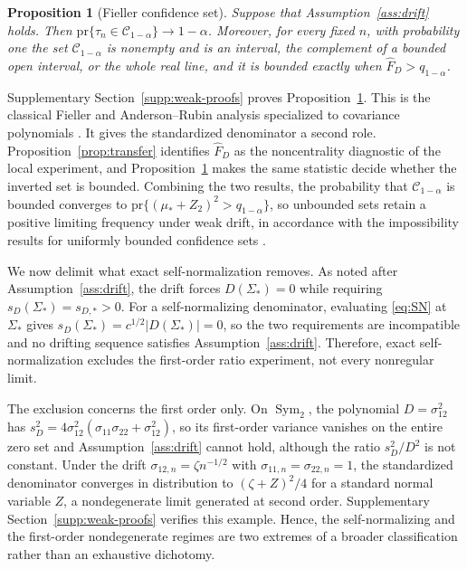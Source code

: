 \documentclass[12pt,a4paper]{article}
\theoremstyle{plain}
\newtheorem{proposition}{Proposition}
\theoremstyle{definition}
\newcommand{\CS}{\mathcal{C}}
\newcommand{\Sym}{\operatorname{Sym}}
\newcommand{\pr}{\mathrm{pr}}
\newcommand{\FD}{\widehat{F}_D}
\begin{document}
\begin{proposition}[Fieller confidence set]
\label{prop:fieller}
    Suppose that Assumption~\ref{ass:drift} holds.
    Then $\pr\{\tau_n\in\CS_{1-\alpha}\}\to1-\alpha$.
    Moreover, for every fixed $n$, with probability one the set $\CS_{1-\alpha}$ is nonempty and is an interval, the complement of a bounded open interval, or the whole real line, and it is bounded exactly when $\FD>q_{1-\alpha}$.
\end{proposition}

Supplementary Section~\ref{supp:weak-proofs} proves Proposition~\ref{prop:fieller}.
This is the classical Fieller and Anderson--Rubin analysis specialized to covariance polynomials \citep{andersonrubin1949,fieller1954}.
It gives the standardized denominator a second role.
Proposition~\ref{prop:transfer} identifies $\FD$ as the noncentrality diagnostic of the local experiment, and Proposition~\ref{prop:fieller} makes the same statistic decide whether the inverted set is bounded.
Combining the two results, the probability that $\CS_{1-\alpha}$ is bounded converges to $\pr\{(\mu_\ast+Z_2)^2>q_{1-\alpha}\}$, so unbounded sets retain a positive limiting frequency under weak drift, in accordance with the impossibility results for uniformly bounded confidence sets \citep{gleserhwang1987,dufour1997}.

We now delimit what exact self-normalization removes.
As noted after Assumption~\ref{ass:drift}, the drift forces $D(\Sigma_\ast)=0$ while requiring $s_D(\Sigma_\ast)=s_{D,\ast}>0$.
For a self-normalizing denominator, evaluating \eqref{eq:SN} at $\Sigma_\ast$ gives $s_D(\Sigma_\ast) = c^{1/2}|D(\Sigma_\ast)|=0$, so the two requirements are incompatible and no drifting sequence satisfies Assumption~\ref{ass:drift}.
Therefore, exact self-normalization excludes the first-order ratio experiment, not every nonregular limit.

The exclusion concerns the first order only.
On $\Sym_2$, the polynomial $D=\sigma_{12}^2$ has $s_D^2=4\sigma_{12}^2(\sigma_{11}\sigma_{22}+\sigma_{12}^2)$, so its first-order variance vanishes on the entire zero set and Assumption~\ref{ass:drift} cannot hold, although the ratio $s_D^2/D^2$ is not constant.
Under the drift $\sigma_{12,n}=\zeta n^{-1/2}$ with $\sigma_{11,n}=\sigma_{22,n}=1$, the standardized denominator converges in distribution to $(\zeta+Z)^2/4$ for a standard normal variable $Z$, a nondegenerate limit generated at second order.
Supplementary Section~\ref{supp:weak-proofs} verifies this example.
Hence, the self-normalizing and the first-order nondegenerate regimes are two extremes of a broader classification rather than an exhaustive dichotomy.
\end{document}
